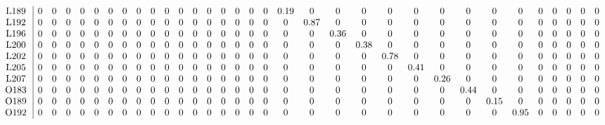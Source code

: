 \begin{table}[H]
\begin{center}
\begin{math}
\begin{array}{c|cccccccccccccccccccccccccccccccc}
\mathrm{L189} \hspace*{2pt} &  0 &  0 &  0 &  0 &  0 &  0 &  0 &  0 &  0 &  0 &  0 &  0 &  0 &  0 &  0 &  0 &  0 &       0.19 &  0 &  0 &  0 &  0 &  0 &  0 &  0 &  0 &  0 &  0 &  0 &  0 &  0 &  0 \\
\mathrm{L192} \hspace*{2pt} &  0 &  0 &  0 &  0 &  0 &  0 &  0 &  0 &  0 &  0 &  0 &  0 &  0 &  0 &  0 &  0 &  0 &  0 &       0.87 &  0 &  0 &  0 &  0 &  0 &  0 &  0 &  0 &  0 &  0 &  0 &  0 &  0 \\
\mathrm{L196} \hspace*{2pt} &  0 &  0 &  0 &  0 &  0 &  0 &  0 &  0 &  0 &  0 &  0 &  0 &  0 &  0 &  0 &  0 &  0 &  0 &  0 &       0.36 &  0 &  0 &  0 &  0 &  0 &  0 &  0 &  0 &  0 &  0 &  0 &  0 \\
\mathrm{L200} \hspace*{2pt} &  0 &  0 &  0 &  0 &  0 &  0 &  0 &  0 &  0 &  0 &  0 &  0 &  0 &  0 &  0 &  0 &  0 &  0 &  0 &  0 &       0.38 &  0 &  0 &  0 &  0 &  0 &  0 &  0 &  0 &  0 &  0 &  0 \\
\mathrm{L202} \hspace*{2pt} &  0 &  0 &  0 &  0 &  0 &  0 &  0 &  0 &  0 &  0 &  0 &  0 &  0 &  0 &  0 &  0 &  0 &  0 &  0 &  0 &  0 &       0.78 &  0 &  0 &  0 &  0 &  0 &  0 &  0 &  0 &  0 &  0 \\
\mathrm{L205} \hspace*{2pt} &  0 &  0 &  0 &  0 &  0 &  0 &  0 &  0 &  0 &  0 &  0 &  0 &  0 &  0 &  0 &  0 &  0 &  0 &  0 &  0 &  0 &  0 &       0.41 &  0 &  0 &  0 &  0 &  0 &  0 &  0 &  0 &  0 \\
\mathrm{L207} \hspace*{2pt} &  0 &  0 &  0 &  0 &  0 &  0 &  0 &  0 &  0 &  0 &  0 &  0 &  0 &  0 &  0 &  0 &  0 &  0 &  0 &  0 &  0 &  0 &  0 &       0.26 &  0 &  0 &  0 &  0 &  0 &  0 &  0 &  0 \\
\mathrm{O183} \hspace*{2pt} &  0 &  0 &  0 &  0 &  0 &  0 &  0 &  0 &  0 &  0 &  0 &  0 &  0 &  0 &  0 &  0 &  0 &  0 &  0 &  0 &  0 &  0 &  0 &  0 &       0.44 &  0 &  0 &  0 &  0 &  0 &  0 &  0 \\
\mathrm{O189} \hspace*{2pt} &  0 &  0 &  0 &  0 &  0 &  0 &  0 &  0 &  0 &  0 &  0 &  0 &  0 &  0 &  0 &  0 &  0 &  0 &  0 &  0 &  0 &  0 &  0 &  0 &  0 &       0.15 &  0 &  0 &  0 &  0 &  0 &  0 \\
\mathrm{O192} \hspace*{2pt} &  0 &  0 &  0 &  0 &  0 &  0 &  0 &  0 &  0 &  0 &  0 &  0 &  0 &  0 &  0 &  0 &  0 &  0 &  0 &  0 &  0 &  0 &  0 &  0 &  0 &  0 &       0.95 &  0 &  0 &  0 &  0 &  0 \\

\end{array}
\end{math}
\end{center}
\end{table}
